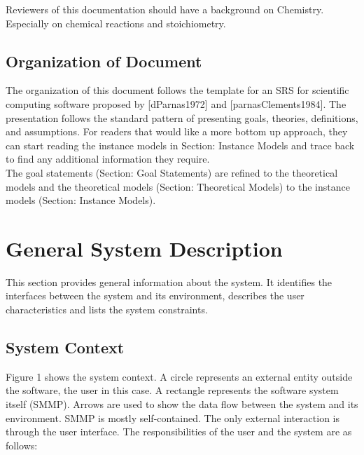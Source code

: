 \documentclass[12pt]{article}
\begin{document}
Reviewers of this documentation should have a background on Chemistry. Especially on chemical reactions and stoichiometry.

\subsection{Organization of Document}

The organization of this document follows the template for an SRS for scientific computing software proposed by [dParnas1972] and [parnasClements1984]. The presentation follows the standard pattern of presenting goals, theories, definitions, and assumptions. For readers that would like a more bottom up approach, they can start reading the instance models in Section: Instance Models and trace back to find any additional information they require. \\
The goal statements (Section: Goal Statements) are refined to the theoretical models and the theoretical models (Section: Theoretical Models) to the instance models (Section: Instance Models). 

\section{General System Description}

This section provides general information about the system.  It identifies the
interfaces between the system and its environment, describes the user
characteristics and lists the system constraints.  

\subsection{System Context}

Figure 1 shows the system context. A circle represents an external entity outside the
software, the user in this case. A rectangle represents the software system itself (SMMP).
Arrows are used to show the data flow between the system and its environment.
SMMP is mostly self-contained. The only external interaction is through the user interface. The responsibilities of the user and the system are as follows:
\end{document}

